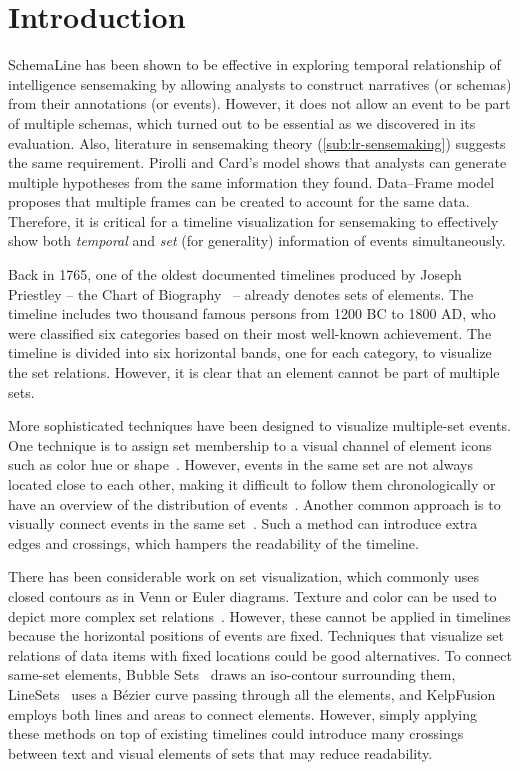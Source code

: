 \section{Introduction}
SchemaLine has been shown to be effective in exploring temporal relationship of intelligence sensemaking by allowing analysts to construct narratives (or schemas) from their annotations (or events). However, it does not allow an event to be part of multiple schemas, which turned out to be essential as we discovered in its evaluation. Also, literature in sensemaking theory (\autoref{sub:lr-sensemaking})  suggests the same requirement. Pirolli and Card's model shows that analysts can generate multiple hypotheses from the same information they found. Data--Frame model proposes that multiple frames can be created to account for the same data. Therefore, it is critical for a timeline visualization for sensemaking to effectively show both \emph{temporal} and \emph{set} (for generality) information of events simultaneously.

Back in 1765, one of the oldest documented timelines produced by Joseph Priestley -- the Chart of Biography~\cite{Priestley1765} -- already denotes sets of elements. The timeline includes two thousand famous persons from 1200 BC to 1800 AD, who were classified six categories based on their most well-known achievement. The timeline is divided into six horizontal bands, one for each category, to visualize the set relations. However, it is clear that an element cannot be part of multiple sets. 

More sophisticated techniques have been designed to visualize multiple-set events. One technique is to assign set membership to a visual channel of element icons such as color hue or shape~\cite{TimeGlider2016}. However, events in the same set are not always located close to each other, making it difficult to follow them chronologically or have an overview of the distribution of events~\cite{SimileTimeline2009,TimeGlider2016}. Another common approach is to visually connect events in the same set~\cite{Kumar1998}. Such a method can introduce extra edges and crossings, which hampers the readability of the timeline. 

There has been considerable work on set visualization, which commonly uses closed contours as in Venn or Euler diagrams. Texture and color can be used to depict more complex set relations~\cite{Ware2013}. However, these cannot be applied in timelines because the horizontal positions of events are fixed. Techniques that visualize set relations of data items with fixed locations could be good alternatives. To connect same-set elements, Bubble Sets~\cite{Collins2009a} draws an iso-contour surrounding them, LineSets~\cite{Alper2011} uses a B\'{e}zier curve passing through all the elements, and KelpFusion~\cite{Meulemans2013} employs both lines and areas to connect elements. However, simply applying these methods on top of existing timelines could introduce many crossings between text and visual elements of sets that may reduce readability.

